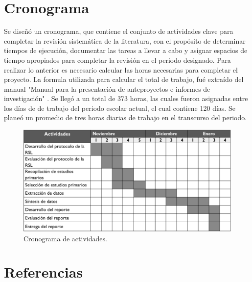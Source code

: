 \documentclass{article}
\begin{document}
\newpage

\section{Cronograma}
Se diseñó un cronograma, que contiene el conjunto de actividades clave para completar la revisión sistemática de la literatura, 
con el propósito de determinar tiempos de ejecución, documentar las tareas a llevar a cabo y asignar espacios de tiempo apropiados 
para completar la revisión en el periodo designado. Para realizar lo anterior es necesario calcular las horas necesarias para completar el proyecto. 
La formula utilizada para calcular el total de trabajo, fué extraído del manual "Manual para la presentación de anteproyectos e informes de investigación" \cite{manualcronograma}.
Se llegó a un total de 373 horas, las cuales fueron asignadas entre los días de de trabajo del periodo escolar actual, el cual contiene 120 días.
Se planeó un promedio de tres horas diarias de trabajo en el transcurso del periodo. 

\begin{figure}[!htb]
   \includegraphics[width=\linewidth]{gant.png}
   \caption{Cronograma de actividades.}
   \label{fig:etapasconducción}
\end{figure}

\newpage

\section{Referencias}
\printbibliography
\end{document}

